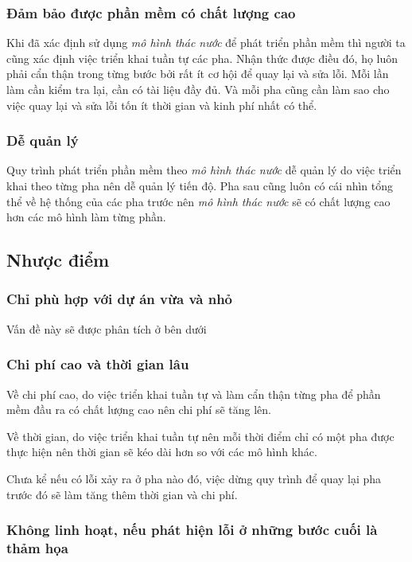 \documentclass[14pt]{extarticle}
\begin{document}
\subsubsection*{Đảm bảo được phần mềm có chất lượng cao}
Khi đã xác định sử dụng \textit{mô hình thác nước} để phát triển phần mềm
thì người ta cũng xác định việc triển khai tuần tự các pha. Nhận thức
được điều đó, họ luôn phải cẩn thận trong từng bước bởi rất ít cơ hội
để quay lại và sửa lỗi. Mỗi lần làm cần kiểm tra lại, cần có tài liệu
đầy đủ. Và mỗi pha cũng cần làm sao cho việc quay lại và sửa lỗi
tốn ít thời gian và kinh phí nhất có thể.

\subsubsection*{Dễ quản lý}
Quy trình phát triển phần mềm theo \textit{mô hình thác nước} dễ quản lý do
việc triển khai theo từng pha nên dễ quản lý tiến độ. Pha sau cũng luôn
có cái nhìn tổng thể về hệ thống của các pha trước nên \textit{mô hình thác nước}
sẽ có chất lượng cao hơn các mô hình làm từng phần.

\subsection{Nhược điểm}

\subsubsection*{Chỉ phù hợp với dự án vừa và nhỏ}
Vấn đề này sẽ được phân tích ở bên dưới

\subsubsection*{Chi phí cao và thời gian lâu}
Về chi phí cao, do việc triển khai tuần tự và làm cẩn thận từng pha
để phần mềm đầu ra có chất lượng cao nên chi phí sẽ tăng lên.


Về thời gian, do việc triển khai tuần tự nên mỗi thời điểm chỉ có một
pha được thực hiện nên thời gian sẽ kéo dài hơn so với các mô hình khác.

Chưa kể nếu có lỗi xảy ra ở pha nào đó, việc dừng quy trình để quay lại
pha trước đó sẽ làm tăng thêm thời gian và chi phí.

\subsubsection*{Không linh hoạt, nếu phát hiện lỗi ở những bước cuối là thảm họa}
\end{document}

